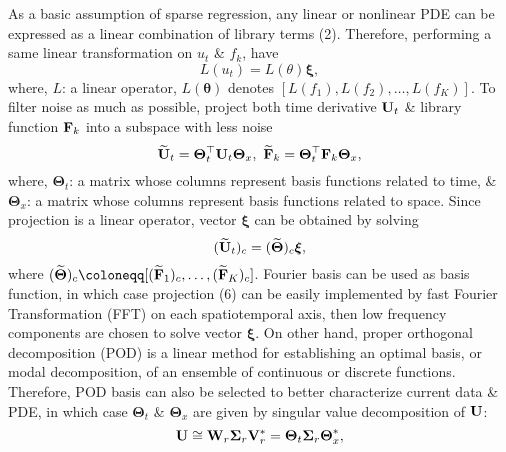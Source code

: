 \documentclass{article}
\begin{document}
\begin{itemize}
\begin{itemize}
		As a basic assumption of sparse regression, any linear or nonlinear PDE can be expressed as a linear combination of library terms (2). Therefore, performing a same linear transformation on $u_t$ \& $f_k$, have
		\begin{equation}
			L(u_t) = L(\theta)\boldsymbol{\xi},
		\end{equation}
		where, $L$: a linear operator, $L(\boldsymbol{\theta})$ denotes $[L(f_1),L(f_2),\ldots,L(f_K)]$. To filter noise as much as possible, project both time derivative ${\bf U}_t$ \& library function ${\bf F}_k$ into a subspace with less noise
		\begin{equation}
			\widetilde{\bf U}_t = \boldsymbol{\Theta}_t^\top{\bf U}_t\boldsymbol{\Theta}_x,\ \widetilde{\bf F}_k = \boldsymbol{\Theta}_t^\top{\bf F}_k\boldsymbol{\Theta}_x,
		\end{equation}
		where, $\boldsymbol{\Theta}_t$: a matrix whose columns represent basis functions related to time, \& $\boldsymbol{\Theta}_x$: a matrix whose columns represent basis functions related to space. Since projection is a linear operator, vector $\boldsymbol{\xi}$ can be obtained by solving
		\begin{equation}
			(\widetilde{\bf U}_t)_c = (\widetilde{\boldsymbol{\Theta}})_c\boldsymbol{\xi},
		\end{equation}
		where $(\widetilde{\boldsymbol{\Theta}})_c\coloneqq[(\widetilde{\bf F}_1)_c,\ldots,(\widetilde{\bf F}_K)_c]$. Fourier basis can be used as basis function, in which case projection (6) can be easily implemented by fast Fourier Transformation (FFT) on each spatiotemporal axis, then low frequency components are chosen to solve vector $\boldsymbol{\xi}$. On other hand, proper orthogonal decomposition (POD) is a linear method for establishing an optimal basis, or modal decomposition, of an ensemble of continuous or discrete functions. Therefore, POD basis can also be selected to better characterize current data \& PDE, in which case $\boldsymbol{\Theta}_t$ \& $\boldsymbol{\Theta}_x$ are given by singular value decomposition of ${\bf U}$:
		\begin{equation}
			{\bf U}\cong{\bf W}_r\boldsymbol{\Sigma}_r{\bf V}_r^* = \boldsymbol{\Theta}_t\boldsymbol{\Sigma}_r\boldsymbol{\Theta}_x^*,
		\end{equation}

\end{itemize}
\end{itemize}
\end{document}
